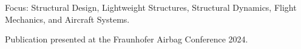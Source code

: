 
\begin{cvitems}
  \item Focus: Structural Design, Lightweight Structures, Structural Dynamics, Flight Mechanics, and Aircraft Systems.
  \item Publication presented at the Fraunhofer Airbag Conference 2024.
\end{cvitems}

\vspace{1em}
